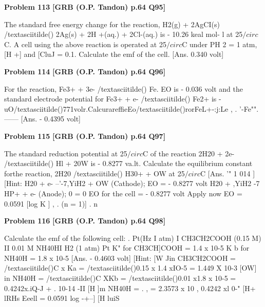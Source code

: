 \begin{problembox}
\textbf{Problem 113} \hfill \textbf{[GRB (O.P. Tandon) p.64 Q95]}
\label{q:ext-grb_all_questions-113}

The standard free energy change for the reaction, 
H2(g) + 2AgCI(s) /textasciitilde() 
2Ag(s) + 2H +(aq.) + 2Cl-(aq.) 
is - 10.26 keal mol- l at 25$/circ$C. A cell using the above reaction 
is operated at 25$/circ$C under PH 2 = 1 atm, [H +] and [CluJ = 0.1. 
Calculate the emf of the cell. 
[Ans. 
0.340 volt]
\end{problembox}

\begin{problembox}
\textbf{Problem 114} \hfill \textbf{[GRB (O.P. Tandon) p.64 Q96]}
\label{q:ext-grb_all_questions-114}

For the reaction, Fe3+ + 3e- /textasciitilde() 
Fe. EO is - 0.036 volt and 
the standard electrode potential for Fe3+ + e- /textasciitilde() 
Fe2+ is 
-uO/textasciitilde()771volr.CalcurareffieEo/textasciitilde()rorFeL+-:j:Le , . '-Fe"".------
[Ans. 
- 0.4395 volt]
\end{problembox}

\begin{problembox}
\textbf{Problem 115} \hfill \textbf{[GRB (O.P. Tandon) p.64 Q97]}
\label{q:ext-grb_all_questions-115}

The standard reduction potential at 25$/circ$C of the reaction 
2H20 + 2e- /textasciitilde() 
Hl + 20W is - 0.8277 va.lt. Calculate the 
equilibrium constant forthe reaction, 
2H20 /textasciitilde() 
H30+ + OW at 25$/circ$C 
[Ans. 
'" 1 014 ] 
[Hint: 
H20 + e- --'-7,YiH2 + OW (Cathode); EO = - 0.8277 volt 
H20 + ,YiH2 -7 HP+ + e-
(Anode);  0 = 0 
EO for the cell = - 0.8277 volt 
Apply now 
EO = 0.0591 [log K ] , . 
(n = 1)] 
. n
\end{problembox}

\begin{problembox}
\textbf{Problem 116} \hfill \textbf{[GRB (O.P. Tandon) p.64 Q98]}
\label{q:ext-grb_all_questions-116}

Calculate the emf of the following cell: 
. Pt(Hz I atm) I CH3CH2COOH (0.15 M) II 0.01 M 
NH40HI H2 (1 atm) Pt 
K" for CH3CH]COOH = 1.4 x 10-5 
K b for NH40H = 1.8 x 10-5 
[Ans. 
- 0.4603 volt] 
[Hint: [W Jin CH3CH2COOH = /textasciitilde()C x Ka = /textasciitilde()0.15 x 1.4 xIO-5 
= 1.449 X 10-3 
[OW] in NH40H = /textasciitilde()C XKb = /textasciitilde()0.01 x1.8 x 10-5 = 0.4242x.iQ-J 
+ . 
10-14 
-II 
[H ]m NH40H = 
. 
, = 2.3573 x 10 
, 
0.4242 xl 0-" 
[H+ lRHs 
Eeell = 0.0591 log -+--] 
[H luiS
\end{problembox}

